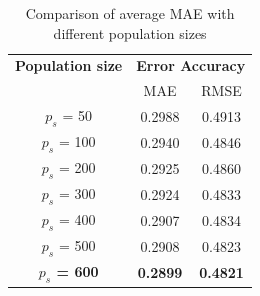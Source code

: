 \documentclass[conference]{IEEEtran}
\begin{document}
\begin{table}[h]
\caption{Comparison of average MAE with different population sizes} 
\begin{center}
\begin{tabular}{| c | c| c |}
\hline
\textbf{Population size} & \multicolumn{2}{c|}{\textbf{Error Accuracy}}  \\ \cline{2-3} 
& MAE & RMSE \\ [0.5ex] \hline
$p_s$ = 50	& 0.2988	& 0.4913 \\ \hline
$p_s$ = 100	& 0.2940	& 0.4846 \\ \hline
$p_s$ = 200	& 0.2925	& 0.4860 \\ \hline
$p_s$ = 300	& 0.2924	& 0.4833 \\ \hline
$p_s$ = 400	& 0.2907	& 0.4834 \\ \hline
$p_s$ = 500	& 0.2908	& 0.4823 \\ \hline
\textbf{$p_s$ = 600}	& \textbf{0.2899}	& \textbf{0.4821} \\ \hline
\end{tabular}
\label{table:2_population_size}
\end{center}
\end{table}
\end{document}
